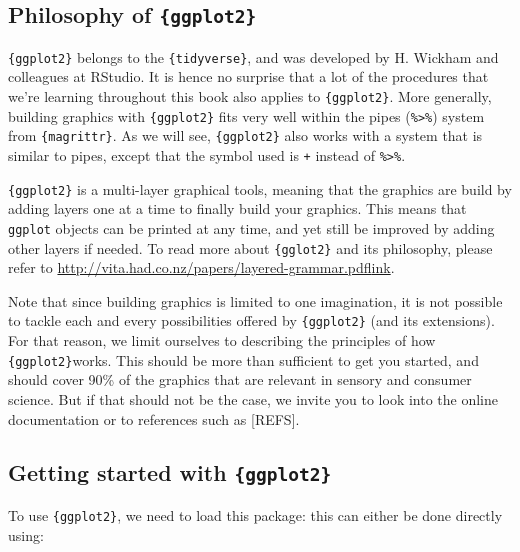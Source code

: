 \documentclass[
]{book}
\begin{document}
\hypertarget{philosophy-of-ggplot2}{%
\subsection{\texorpdfstring{Philosophy of \texttt{\{ggplot2\}}}{Philosophy of \{ggplot2\}}}\label{philosophy-of-ggplot2}}

\texttt{\{ggplot2\}} belongs to the \texttt{\{tidyverse\}}, and was developed by H. Wickham and colleagues at RStudio. It is hence no surprise that a lot of the procedures that we're learning throughout this book also applies to \texttt{\{ggplot2\}}. More generally, building graphics with \texttt{\{ggplot2\}} fits very well within the pipes (\texttt{\%\textgreater{}\%}) system from \texttt{\{magrittr\}}. As we will see, \texttt{\{ggplot2\}} also works with a system that is similar to pipes, except that the symbol used is \texttt{+} instead of \texttt{\%\textgreater{}\%}.

\texttt{\{ggplot2\}} is a multi-layer graphical tools, meaning that the graphics are build by adding layers one at a time to finally build your graphics. This means that \texttt{ggplot} objects can be printed at any time, and yet still be improved by adding other layers if needed. To read more about \texttt{\{gglot2\}} and its philosophy, please refer to \url{http://vita.had.co.nz/papers/layered-grammar.pdf}\href{http://vita.had.co.nz/papers/layered-grammar.pdf}{link}.

Note that since building graphics is limited to one imagination, it is not possible to tackle each and every possibilities offered by \texttt{\{ggplot2\}} (and its extensions). For that reason, we limit ourselves to describing the principles of how \texttt{\{ggplot2\}}works. This should be more than sufficient to get you started, and should cover 90\% of the graphics that are relevant in sensory and consumer science. But if that should not be the case, we invite you to look into the online documentation or to references such as {[}REFS{]}.

\hypertarget{getting-started-with-ggplot2}{%
\subsection{\texorpdfstring{Getting started with \texttt{\{ggplot2\}}}{Getting started with \{ggplot2\}}}\label{getting-started-with-ggplot2}}

To use \texttt{\{ggplot2\}}, we need to load this package: this can either be done directly using:
\end{document}
